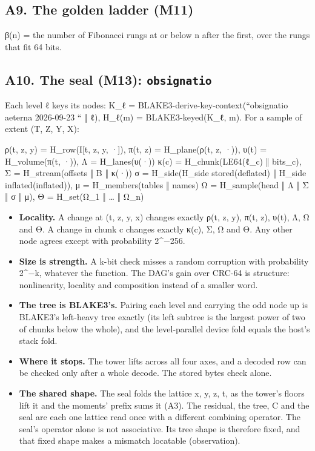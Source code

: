 \subsection{\texorpdfstring{A9. The golden ladder (M11)}{A9. The golden ladder (M11)}}

β(n) = the number of Fibonacci rungs at or below n after the first, over the rungs that fit 64 bits.

\subsection{\texorpdfstring{A10. The seal (M13): \texttt{obsignatio}}{A10. The seal (M13): obsignatio}}

Each level ℓ keys its nodes: K\_\allowbreak{}ℓ = BLAKE3-derive-key-context(“obsignatio aeterna 2026-09-23 “ ‖ ℓ), H\_\allowbreak{}ℓ(m) = BLAKE3-keyed(K\_\allowbreak{}ℓ, m). For a sample of extent (T, Z, Y, X):

ρ(t, z, y) = H\_\allowbreak{}row(I[t, z, y, ·]),  π(t, z) = H\_\allowbreak{}plane(ρ(t, z, ·)),  υ(t) = H\_\allowbreak{}volume(π(t, ·)),  Λ = H\_\allowbreak{}lanes(υ(·)) κ(c) = H\_\allowbreak{}chunk(LE64(ℓ\_\allowbreak{}c) ‖ bits\_\allowbreak{}c),  Σ = H\_\allowbreak{}stream(offsets ‖ B ‖ κ(·)) σ = H\_\allowbreak{}side(H\_\allowbreak{}side stored(deflated) ‖ H\_\allowbreak{}side inflated(inflated)),  μ = H\_\allowbreak{}members(tables ‖ names) Ω = H\_\allowbreak{}sample(head ‖ Λ ‖ Σ ‖ σ ‖ μ),  Θ = H\_\allowbreak{}set(Ω\_\allowbreak{}1 ‖ … ‖ Ω\_\allowbreak{}n)

\begin{itemize}
\item \textbf{Locality.} A change at (t, z, y, x) changes exactly ρ(t, z, y), π(t, z), υ(t), Λ, Ω and Θ. A change in chunk c changes exactly κ(c), Σ, Ω and Θ. Any other node agrees except with probability 2\textasciicircum{}−256.
\item \textbf{Size is strength.} A k-bit check misses a random corruption with probability 2\textasciicircum{}−k, whatever the function. The DAG's gain over CRC-64 is structure: nonlinearity, locality and composition instead of a smaller word.
\item \textbf{The tree is BLAKE3's.} Pairing each level and carrying the odd node up is BLAKE3's left-heavy tree exactly (its left subtree is the largest power of two of chunks below the whole), and the level-parallel device fold equals the host's stack fold.
\item \textbf{Where it stops.} The tower lifts across all four axes, and a decoded row can be checked only after a whole decode. The stored bytes check alone.
\item \textbf{The shared shape.} The seal folds the lattice x, y, z, t, as the tower's floors lift it and the moments' prefix sums it (A3). The residual, the tree, C and the seal are each one lattice read once with a different combining operator. The seal's operator alone is not associative. Its tree shape is therefore fixed, and that fixed shape makes a mismatch locatable (observation).
\end{itemize}

